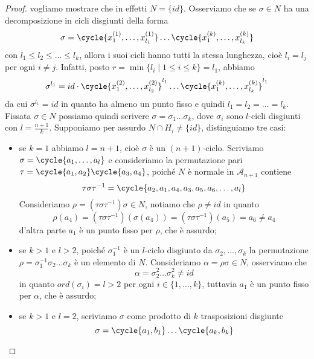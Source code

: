 \documentclass[11pt]{scrartcl}
\begin{document}
\begin{proof}
    vogliamo mostrare che in effetti $N = \{id\}$. Osserviamo che se
    $\sigma \in N$ ha una decomposizione in cicli disgiunti
    della forma
    \[
        \sigma = \cycle{x_1^{(1)}, \ldots, x_{l_1}^{(1)}}\ldots\cycle{x_1^{(k)}, \ldots, x_{l_k}^{(k)}}
    \]
    con $l_1\leqslant l_2\leqslant \ldots\leqslant l_k$, allora i suoi cicli 
    hanno tutti la stessa lunghezza, cioè $l_i = l_j$ per ogni $i \neq j$.
    Infatti, posto $r = \min\{l_i\mid 1\leqslant i \leqslant k\} = l_1$, 
    abbiamo
    \[
        \sigma^{l_1} = id \cdot \cycle{x_1^{(2)}, \ldots, x_{l_2}^{(2)}}^{l_1}
        \ldots\cycle{x_1^{(k)}, \ldots, x_{l_k}^{(k)}}^{l_1}
    \]
    da cui $\sigma^{l_1} = id$ in quanto ha almeno un punto fisso e quindi 
    $l_1 = l_2 = \ldots = l_k$. Fissata $\sigma \in N$ possiamo quindi scrivere
    $\sigma = \sigma_1\ldots\sigma_k$,
    dove $\sigma_i$ sono $l$-cicli disgiunti con $l = \displaystyle\frac{n + 1}{k}$.
    Supponiamo per assurdo $N\cap H_i \neq \{id\}$, distinguiamo tre casi:
    \begin{itemize}
        \item se $k = 1$ abbiamo $l = n + 1$, cioè $\sigma$ è un $(n + 1)$-ciclo.
        Scriviamo $\sigma = \cycle{a_1, \ldots, a_l}$ e consideriamo la permutazione
        pari $\tau = \cycle{a_1, a_2}\cycle{a_3, a_4}$, poiché $N$ è normale in 
        $\mathcal{A}_{n + 1}$ contiene
        \[
            \tau\sigma\tau^{-1} = \cycle{a_2, a_1, a_4, a_3, a_5, a_6, \ldots, a_l}
        \]
        Consideriamo $\rho = (\tau\sigma\tau^{-1})\sigma \in N$, notiamo che
        $\rho \neq id$ in quanto
        \[
            \rho(a_4) = (\tau\sigma\tau^{-1})(\sigma(a_4)) = (\tau\sigma\tau^{-1})(a_5) = 
            a_6 \neq a_4
        \]
        d'altra parte $a_1$ è un punto fisso per $\rho$, che è assurdo;
        \item se $k > 1$ e $l > 2$, poiché $\sigma_1^{-1}$ è un $l$-ciclo
        disgiunto da $\sigma_2, \ldots, \sigma_k$ la permutazione 
        $\rho = \sigma_1^{-1}\sigma_2\ldots\sigma_k$ è un elemento di $N$. 
        Consideriamo $\alpha = \rho\sigma \in N$, osserviamo che 
        \[
            \alpha = \sigma_2^2\ldots\sigma_k^2 \neq id
        \]
        in quanto $ord(\sigma_i) = l > 2$ per ogni $i \in \{1, \ldots, k\}$,
        tuttavia $a_1$ è un punto fisso per $\alpha$, che è assurdo;
        \item se $k > 1$ e $l = 2$, scriviamo $\sigma$ come prodotto di $k$
        trasposizioni disgiunte
        \[
            \sigma = \cycle{a_1, b_1}\ldots\cycle{a_k, b_k}
        \]

\end{itemize}
\end{proof}
\end{document}
